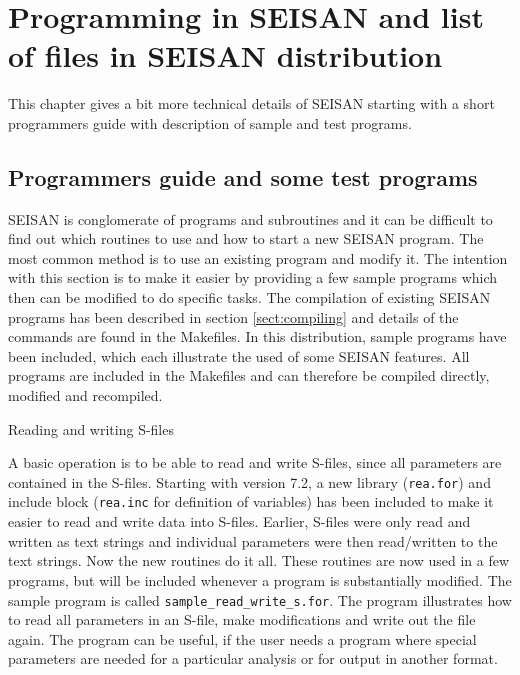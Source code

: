 %
\chapter{Programming in SEISAN and list of files in SEISAN distribution}
\label{chap:programming}

This chapter gives a bit more technical details of SEISAN starting 
with a short programmers guide with description of sample and test programs. 

\section{Programmers guide and some test programs}

SEISAN is conglomerate of programs and subroutines and it can be 
difficult to find out which routines to use and how to start a new 
SEISAN program. The most common method is to use an existing program 
and modify it. The intention with this section is to make it easier 
by providing a few sample programs which then can be modified to 
do specific tasks. 
The compilation of existing SEISAN programs has been described in 
section \ref{sect:compiling} and details of the commands are found in the Makefiles. 
In this distribution, sample programs have been included, which 
each illustrate the used of some SEISAN features. All  programs 
are included in the Makefiles and can therefore be compiled directly, 
modified and recompiled. 

Reading and writing S-files 

A basic operation is to be able to read and write S-files, since 
all parameters are contained in the S-files. Starting with version 
7.2, a new library (\texttt{rea.for}) and include block (\texttt{rea.inc} 
for definition 
of variables) has been included to make it easier to read and 
write data into S-files. Earlier, S-files were only read and written 
as text strings and individual parameters were then read/written to 
the text strings. Now the new routines do it all. These routines are 
now used in a few programs, but will be included whenever a program 
is substantially modified. The sample program is called 
\texttt{sample\_read\_write\_s.for}. The program illustrates how to read all 
parameters in an S-file, make modifications and write out the file 
again. The program can be useful, if the user needs a program where 
special parameters are needed for a particular analysis or for output 
in another format. 

